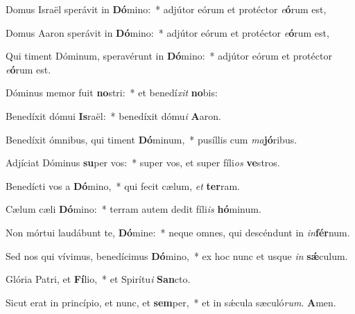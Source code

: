 \item Domus Israël sperávit in \textbf{Dó}mino:~* adjútor eórum et protéctor \textit{e}\textbf{ó}rum est,

\item Domus Aaron sperávit in \textbf{Dó}mino:~* adjútor eórum et protéctor \textit{e}\textbf{ó}rum est,

\item Qui timent Dóminum, speravérunt in \textbf{Dó}mino:~* adjútor eórum et protéctor \textit{e}\textbf{ó}rum est.

\item Dóminus memor fuit \textbf{no}stri:~* et benedí\textit{xit} \textbf{no}bis:

\item Benedíxit dómui \textbf{Is}raël:~* benedíxit dómu\textit{i} \textbf{A}aron.

\item Benedíxit ómnibus, qui timent \textbf{Dó}minum,~* pusíllis cum \textit{ma}\textbf{jó}ribus.

\item Adjíciat Dóminus \textbf{su}per vos:~* super vos, et super fíli\textit{os} \textbf{ve}stros.

\item Benedícti vos a \textbf{Dó}mino,~* qui fecit cælum, \textit{et} \textbf{ter}ram.

\item Cælum cæli \textbf{Dó}mino:~* terram autem dedit fíli\textit{is} \textbf{hó}minum.

\item Non mórtui laudábunt te, \textbf{Dó}mine:~* neque omnes, qui descéndunt in \textit{in}\textbf{fér}num.

\item Sed nos qui vívimus, benedícimus \textbf{Dó}mino,~* ex hoc nunc et usque \textit{in} \textbf{sǽ}culum.

\item Glória Patri, et \textbf{Fí}lio,~* et Spirítu\textit{i} \textbf{San}cto.

\item Sicut erat in princípio, et nunc, et \textbf{sem}per,~* et in sǽcula sæculó\textit{rum}. \textbf{A}men.
